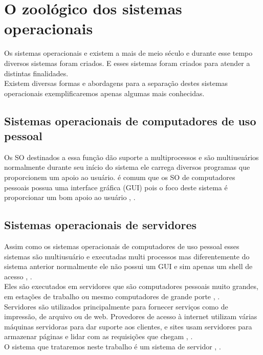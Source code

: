 \section{O zoológico dos sistemas operacionais}
Os sistemas operacionais e existem a mais de meio século e durante esse tempo diversos sistemas foram criados. E esses sistemas foram criados para atender a distintas finalidades.\\
Existem diversas formas e abordagens para a separação destes sistemas operacionais exemplificaremos apenas algumas mais conhecidas.

\subsection{Sistemas operacionais de computadores de uso pessoal}

Os SO destinados a essa função dão suporte a multiprocessos e são multiusuários normalmente durante seu início do sistema ele carrega diversos programas que proporcionem um apoio ao usuário. é comum que os SO de computadores pessoais possua uma interface gráfica (GUI) pois o foco deste sistema é proporcionar um bom apoio ao usuário \cite{Tanenbaum2016}, \cite{Comer2012}.\\

\subsection{Sistemas operacionais de servidores}

Assim como os sistemas operacionais de computadores de uso pessoal esses sistemas são multiusuário e executadas multi processos mas diferentemente do sistema anterior normalmente ele não possui um GUI e sim apenas um shell de acesso \cite{Tanenbaum2016}, \cite{Comer2012}.\\
Eles são executados em servidores que são computadores pessoais muito grandes, em estações de trabalho ou mesmo computadores de grande porte \cite{Tanenbaum2016}, \cite{Comer2012}.\\
Servidores são utilizados principalmente para fornecer serviços como  de impressão, de arquivo ou de web. Provedores de acesso à internet utilizam várias máquinas servidoras para dar suporte aos clientes, e sites usam servidores para armazenar páginas e lidar com as requisições que chegam \cite{Tanenbaum2016}, \cite{Comer2012}.\\
O sistema que trataremos neste trabalho é um sistema de servidor \cite{Tanenbaum2016}, \cite{Comer2012}.\\

